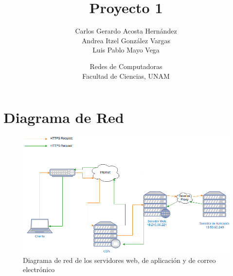 \documentclass[9pt]{article}
\title{Proyecto 1}
\author{Carlos Gerardo Acosta Hernández \\ Andrea Itzel González Vargas \\ Luis Pablo Mayo Vega}
\date{Redes de Computadoras\\Facultad de Ciencias, UNAM}
\begin{document}
\maketitle

\tableofcontents

\newpage

\section{Diagrama de Red}
\begin{figure}[ht!]
  \centering
  \includegraphics[width=0.8\linewidth]{net_diagram}
  \caption{Diagrama de red de los servidores web, de aplicación y de correo electrónico}
\end{figure}
\end{document}
